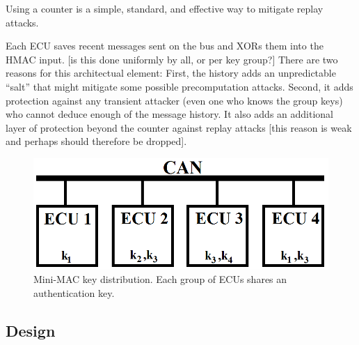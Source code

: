 Using a counter is a simple, standard, and effective way to mitigate replay attacks.  

Each ECU saves recent messages sent on the bus and XORs them into the HMAC input. 
[is this done uniformly by all, or per key group?] 
There are two reasons for this architectual element:  First, 
the history adds an unpredictable ``salt'' that might mitigate some possible
precomputation attacks.  Second, it adds protection against any transient
attacker (even one who knows the group keys) who cannot deduce enough of the 
message history.  It also adds an additional layer of protection 
beyond the counter against replay attacks [this reason is weak and perhaps should therefore be dropped].
	
	\begin{figure}
		\centering
		\includegraphics[width=\columnwidth]{figures/key_distribution.png}
		\caption{Mini-MAC key distribution.  Each group of ECUs shares an authentication key.}
		\label{fig-key}
	\end{figure}
	
\subsection{Design}
\label{design}

